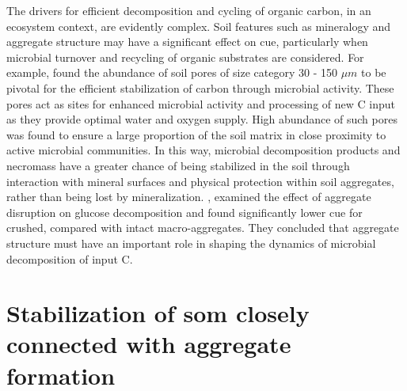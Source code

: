 	The drivers for efficient decomposition and cycling of organic carbon, in an ecosystem context, are evidently complex.
	Soil features such as mineralogy and aggregate structure may have a significant effect on \gls{cue}, particularly when microbial turnover and recycling of organic substrates are considered. For example, \citet{kravchenko2019} found the abundance of soil pores of size category 30 - 150 $ \mu m $ to be pivotal for the efficient stabilization of carbon through microbial activity. These pores act as sites for enhanced microbial activity and processing of new C input as they provide optimal water and oxygen supply. High abundance of such pores was found to ensure a large proportion of the soil matrix in close proximity to active microbial communities. In this way, microbial decomposition products and necromass have a greater chance of being stabilized in the soil through interaction with mineral surfaces and physical protection within soil aggregates, rather than being lost by mineralization.
	\citet{tian2015}, examined the effect of aggregate disruption on glucose decomposition and found significantly lower \gls{cue} for crushed, compared with intact macro-aggregates. They concluded that aggregate structure must have an important role in shaping the dynamics of microbial decomposition of input C.

\section{Stabilization of \gls{som} closely connected with aggregate formation}

